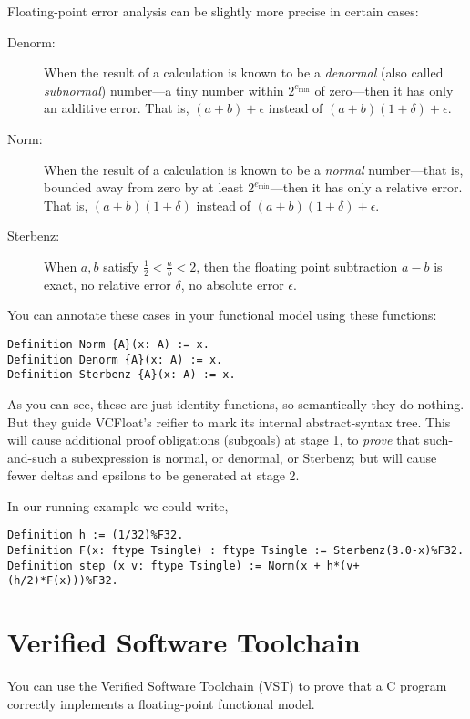\documentclass[article]{memoir}
\begin{document}
Floating-point error analysis can be slightly more precise
in certain cases:

\begin{description}
\item[Denorm:]  When the result of a calculation is known to be a
  \emph{denormal} (also called \emph{subnormal}) number---a tiny
  number within $2^{e_\mathrm{min}}$ of zero---then it has only
  an additive error.  That is, $(a+b)+\epsilon$ instead of
  $(a+b)(1+\delta)+\epsilon$.
\item[Norm:]
   When the result of a calculation is known to be a
   \emph{normal} number---that is, bounded away from zero by
   at least $2^{e_\mathrm{min}}$---then it has only
  a relative error.  That is, $(a+b)(1+\delta)$ instead of
  $(a+b)(1+\delta)+\epsilon$.
\item[Sterbenz:]  When $a,b$ satisfy $\frac{1}{2} < \frac{a}{b} < 2$,
  then the floating point subtraction $a-b$ is exact, no relative
  error $\delta$, no absolute error $\epsilon$.
\end{description}

You can annotate these cases in your functional model using these functions:

\begin{lstlisting}
Definition Norm {A}(x: A) := x.
Definition Denorm {A}(x: A) := x.
Definition Sterbenz {A}(x: A) := x.
\end{lstlisting}

As you can see, these are just identity functions, so semantically they
do nothing.  But they guide VCFloat's reifier to mark its internal
abstract-syntax tree.  This will cause additional proof obligations
(subgoals) at stage 1, to \emph{prove} that such-and-such a subexpression
is normal, or denormal, or Sterbenz; but will cause fewer
deltas and epsilons to be generated at stage 2.

In our running example we could write,
\begin{lstlisting}
Definition h := (1/32)%F32.
Definition F(x: ftype Tsingle) : ftype Tsingle := Sterbenz(3.0-x)%F32.  
Definition step (x v: ftype Tsingle) := Norm(x + h*(v+(h/2)*F(x)))%F32.
\end{lstlisting}

\chapter{Verified Software Toolchain}

You can use the Verified Software Toolchain (VST) to prove that a C program
correctly implements a floating-point functional model.
\end{document}
